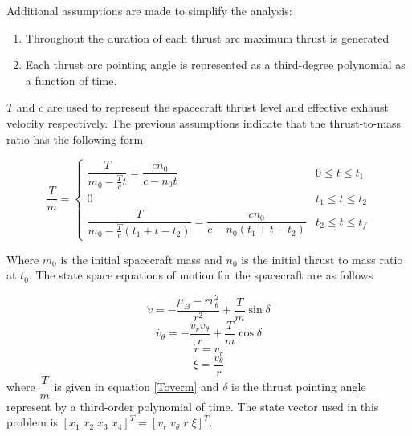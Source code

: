 \noindent Additional assumptions are made to simplify the analysis:

\begin{enumerate}
    \item Throughout the duration of each thrust arc maximum thrust is generated
    \item Each thrust arc pointing angle is represented as a third-degree polynomial as a function of time.
\end{enumerate}

$T$ and $c$ are used to represent the spacecraft thrust level and effective exhaust velocity respectively. The previous assumptions
indicate that the thrust-to-mass ratio has the following form

\begin{equation}
\dfrac{T}{m} = \begin{cases} 
    \dfrac{T}{m_0-\frac{T}{c}t} = \dfrac{cn_0}{c-n_0t} & 0\leq t \leq t_1 \\
    0 & t_1\leq t \leq t_2 \\
    \dfrac{T}{m_0-\frac{T}{c}(t_1+t-t_2)} = \dfrac{cn_0}{c-n_0(t_1+t-t_2)} & t_2\leq t \leq t_f 
  \end{cases}
  \label{Toverm}
\end{equation}

\noindent Where $m_0$ is the initial spacecraft mass and $n_0$ is the initial thrust to mass ratio at $t_0$.
The state space equations of motion for the spacecraft are as follows

\begin{equation}
    \dot{v} = -\dfrac{\mu_B-rv_\theta^2}{r^2}+\dfrac{T}{m}\sin\delta
    \label{vrdot_eom}
\end{equation}
\begin{equation}
\dot{v_\theta} = -\dfrac{v_rv_\theta}{r}+\dfrac{T}{m}\cos\delta
\label{vthetadot_eom}
\end{equation}
\begin{equation}
    \dot{r} = v_r
    \label{rdot_eom}
\end{equation}
\begin{equation}
\dot{\xi} = \dfrac{v_\theta}{r}
\end{equation}
where $\dfrac{T}{m}$ is given in equation \ref{Toverm} and $\delta$ is the thrust pointing angle represent by a
third-order polynomial of time. The state vector used in this problem is $[x_1 \; x_2 \; x_3 \; x_4]^T = [ v_r \; v_\theta \; r \; \xi ]^T$. \linebreak

